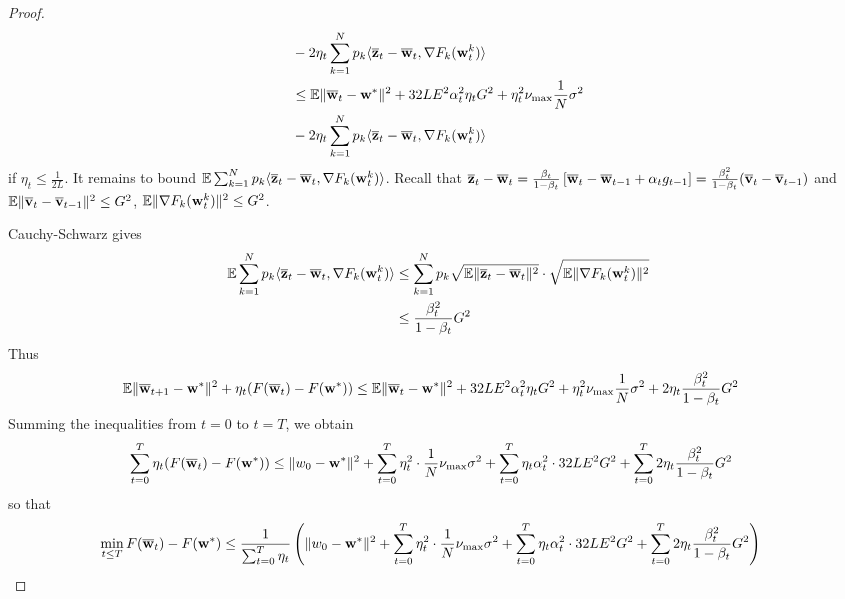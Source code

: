 \begin{proof}
\begin{align*}
	& -2\eta_{t}\sum_{k=1}^{N}p_{k}\langle{\overline{\mathbf{z}}}_{t}-{\overline{\mathbf{w}}}_{t},\nabla F_{k}({\mathbf{w}}_{t}^{k})\rangle\\
	& \leq\mathbb{E}\|{\overline{\mathbf{w}}}_{t}-{\mathbf{w}}^{\ast}\|^{2}+32LE^{2}\alpha_{t}^{2}\eta_{t}G^{2}+\eta_{t}^{2}\nu_{\max}\frac{1}{N}\sigma^{2}\\
	& -2\eta_{t}\sum_{k=1}^{N}p_{k}\langle{\overline{\mathbf{z}}}_{t}-{\overline{\mathbf{w}}}_{t},\nabla F_{k}({\mathbf{w}}_{t}^{k})\rangle
	\end{align*}
	if $\eta_{t}\leq\frac{1}{2L}$. It remains to bound $\mathbb{E}\sum_{k=1}^{N}p_{k}\langle{\overline{\mathbf{z}}}_{t}-{\overline{\mathbf{w}}}_{t},\nabla F_{k}({\mathbf{w}}_{t}^{k})\rangle$.
	Recall that ${\overline{\mathbf{z}}}_{t}-{\overline{\mathbf{w}}}_{t}=\frac{\beta_{t}}{1-\beta_{t}}\left[{\overline{\mathbf{w}}}_{t}-{\overline{\mathbf{w}}}_{t-1}+\alpha_{t}g_{t-1}\right]=\frac{\beta_{t}^{2}}{1-\beta_{t}}({\overline{\mathbf{v}}}_{t}-{\overline{\mathbf{v}}}_{t-1})$
	and $\mathbb{E}\|{\overline{\mathbf{v}}}_{t}-{\overline{\mathbf{v}}}_{t-1}\|^{2}\leq G^{2}$,
	$\mathbb{E}\|\nabla F_{k}({\mathbf{w}}_{t}^{k})\|^{2}\leq G^{2}$. 
	
	Cauchy-Schwarz gives
	\begin{align*}
	\mathbb{E}\sum_{k=1}^{N}p_{k}\langle{\overline{\mathbf{z}}}_{t}-{\overline{\mathbf{w}}}_{t},\nabla F_{k}({\mathbf{w}}_{t}^{k})\rangle & \leq\sum_{k=1}^{N}p_{k}\sqrt{\mathbb{E}\|{\overline{\mathbf{z}}}_{t}-{\overline{\mathbf{w}}}_{t}\|^{2}}\cdot\sqrt{\mathbb{E}\|\nabla F_{k}({\mathbf{w}}_{t}^{k})\|^{2}}\\
	& \leq\frac{\beta_{t}^{2}}{1-\beta_{t}}G^{2}
	\end{align*}
	Thus 
	\begin{align*}
	\mathbb{E}\|{\overline{\mathbf{w}}}_{t+1}-{\mathbf{w}}^{\ast}\|^{2}+\eta_{t}(F({\overline{\mathbf{w}}}_{t})-F({\mathbf{w}}^{\ast})) & \leq\mathbb{E}\|{\overline{\mathbf{w}}}_{t}-{\mathbf{w}}^{\ast}\|^{2}+32LE^{2}\alpha_{t}^{2}\eta_{t}G^{2}+\eta_{t}^{2}\nu_{\max}\frac{1}{N}\sigma^{2}+2\eta_{t}\frac{\beta_{t}^{2}}{1-\beta_{t}}G^{2}
	\end{align*}
	Summing the inequalities from $t=0$ to $t=T$, we obtain 
	\begin{align*}
	\sum_{t=0}^{T}\eta_{t}(F({\overline{\mathbf{w}}}_{t})-F({\mathbf{w}}^{\ast})) & \leq\|w_{0}-{\mathbf{w}}^{\ast}\|^{2}+\sum_{t=0}^{T}\eta_{t}^{2}\cdot\frac{1}{N}\nu_{\max}\sigma^{2}+\sum_{t=0}^{T}\eta_{t}\alpha_{t}^{2}\cdot32LE^{2}G^{2}+\sum_{t=0}^{T}2\eta_{t}\frac{\beta_{t}^{2}}{1-\beta_{t}}G^{2}
	\end{align*}
	so that
	\begin{align*}
	\min_{t\leq T}F({\overline{\mathbf{w}}}_{t})-F({\mathbf{w}}^{\ast}) & \leq\frac{1}{\sum_{t=0}^{T}\eta_{t}}\left(\|w_{0}-{\mathbf{w}}^{\ast}\|^{2}+\sum_{t=0}^{T}\eta_{t}^{2}\cdot\frac{1}{N}\nu_{\max}\sigma^{2}+\sum_{t=0}^{T}\eta_{t}\alpha_{t}^{2}\cdot32LE^{2}G^{2}+\sum_{t=0}^{T}2\eta_{t}\frac{\beta_{t}^{2}}{1-\beta_{t}}G^{2}\right)
	\end{align*}
	

\end{proof}
